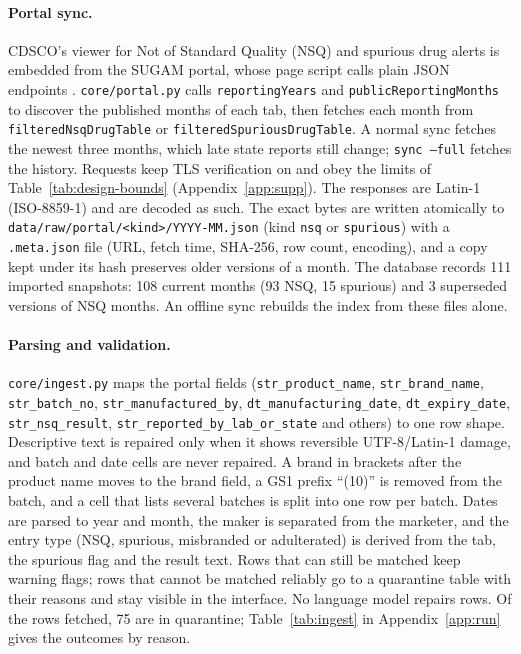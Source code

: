 \paragraph{Portal sync.} CDSCO's viewer for Not of Standard Quality (NSQ) and spurious drug alerts is embedded from the SUGAM portal, whose page script calls plain JSON endpoints \cite{cdsco2026portal}. \texttt{core/portal.py} calls \texttt{reportingYears} and \texttt{publicReportingMonths} to discover the published months of each tab, then fetches each month from \texttt{filteredNsqDrugTable} or \texttt{filteredSpuriousDrugTable}. A normal sync fetches the newest three months, which late state reports still change; \texttt{sync --full} fetches the history. Requests keep TLS verification on and obey the limits of Table~\ref{tab:design-bounds} (Appendix~\ref{app:supp}). The responses are Latin-1 (ISO-8859-1) and are decoded as such. The exact bytes are written atomically to \texttt{data/raw/portal/<kind>/YYYY-MM.json} (kind \texttt{nsq} or \texttt{spurious}) with a \texttt{.meta.json} file (URL, fetch time, SHA-256, row count, encoding), and a copy kept under its hash preserves older versions of a month. The database records 111 imported snapshots: 108 current months (93 NSQ, 15 spurious) and 3 superseded versions of NSQ months. An offline sync rebuilds the index from these files alone.

\paragraph{Parsing and validation.} \texttt{core/ingest.py} maps the portal fields (\texttt{str\_product\_name}, \texttt{str\_brand\_name}, \texttt{str\_batch\_no}, \texttt{str\_manufactured\_by}, \texttt{dt\_manufacturing\_date}, \texttt{dt\_expiry\_date}, \texttt{str\_nsq\_result}, \texttt{str\_reported\_by\_lab\_or\_state} and others) to one row shape. Descriptive text is repaired only when it shows reversible UTF-8/Latin-1 damage, and batch and date cells are never repaired. A brand in brackets after the product name moves to the brand field, a GS1 prefix ``(10)'' is removed from the batch, and a cell that lists several batches is split into one row per batch. Dates are parsed to year and month, the maker is separated from the marketer, and the entry type (NSQ, spurious, misbranded or adulterated) is derived from the tab, the spurious flag and the result text. Rows that can still be matched keep warning flags; rows that cannot be matched reliably go to a quarantine table with their reasons and stay visible in the interface. No language model repairs rows. Of the rows fetched, 75 are in quarantine; Table~\ref{tab:ingest} in Appendix~\ref{app:run} gives the outcomes by reason.



